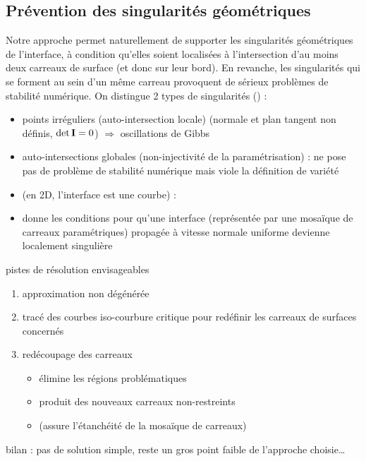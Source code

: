 \subsection{Prévention des singularités géométriques}
Notre approche permet naturellement de supporter les singularités géométriques de l'interface, à condition qu'elles soient localisées à l'intersection d'au moins deux carreaux de surface (et donc sur leur bord).
En revanche, les singularités qui se forment au sein d'un même carreau provoquent de sérieux problèmes de stabilité numérique.
On distingue 2 types de singularités (\cite[p.320]{patrikalakis2009}) :
\begin{itemize}
	\item points irréguliers (auto-intersection locale) (normale et plan tangent non définis, $\det{\mathbf{I}} = 0$) $\Rightarrow$ oscillations de Gibbs
	\item auto-intersections globales (non-injectivité de la paramétrisation) : ne pose pas de problème de stabilité numérique mais viole la définition de variété
\end{itemize}

\begin{itemize}
	\item \cite{jiao2001} (en 2D, \ie l'interface est une courbe) : 
	\item \cite{farouki1986} donne les conditions pour qu'une interface (représentée par une mosaïque de carreaux paramétriques) propagée à vitesse normale uniforme devienne localement singulière
\end{itemize}

pistes de résolution envisageables
\begin{enumerate}
	\item approximation non dégénérée \cite{farouki1986}
	\item tracé des courbes iso-courbure critique \cite[chap.8]{patrikalakis2009} pour redéfinir les carreaux de surfaces concernés
	\item redécoupage des carreaux \cite{urick2019} 
	\begin{itemize}
		\item élimine les régions problématiques
		\item produit des nouveaux carreaux non-restreints
		\item (assure l'étanchéité de la mosaïque de carreaux)
	\end{itemize}
	
\end{enumerate}

bilan : pas de solution simple, reste un gros point faible de l'approche choisie\ldots